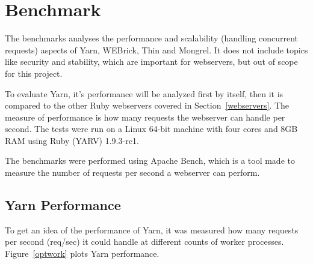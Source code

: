 \section{Benchmark}
\label{eval}
The benchmarks analyses the performance and scalability (handling
concurrent requests) aspects of Yarn, WEBrick, Thin and Mongrel. It does not
include topics like security and stability, which are important for
webservers, but out of scope for this project.

To evaluate Yarn, it's performance will be analyzed first by itself, then it
is compared to the other Ruby webservers covered in Section~\ref{webservers}.
The measure of performance is how many requests the webserver can handle per
second. The tests were run on a Linux 64-bit machine with four cores and 8GB RAM
using Ruby (YARV) 1.9.3-rc1.

The benchmarks were performed using Apache Bench, which is a tool made to
measure the number of requests per second a webserver can perform.

\subsection{Yarn Performance}
To get an idea of the performance of Yarn, it was measured how many requests
per second (req/sec) it could handle at different counts of worker processes.
Figure~\ref{optwork} plots Yarn performance.

